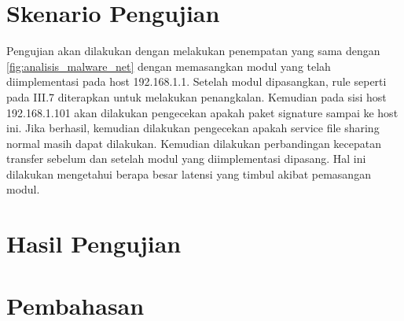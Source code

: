 \section{Skenario Pengujian}

Pengujian akan dilakukan dengan melakukan penempatan yang sama dengan \ref{fig:analisis_malware_net} dengan memasangkan modul yang telah diimplementasi pada host 192.168.1.1. Setelah modul dipasangkan, rule seperti pada III.7 diterapkan untuk melakukan penangkalan. Kemudian pada sisi host 192.168.1.101 akan dilakukan pengecekan apakah paket signature sampai ke host ini.
Jika berhasil, kemudian dilakukan pengecekan apakah service file sharing normal masih dapat dilakukan.
Kemudian dilakukan perbandingan kecepatan transfer sebelum dan setelah modul yang diimplementasi dipasang. Hal ini dilakukan mengetahui berapa besar latensi yang timbul akibat pemasangan modul.

\section{Hasil Pengujian}

\section{Pembahasan}